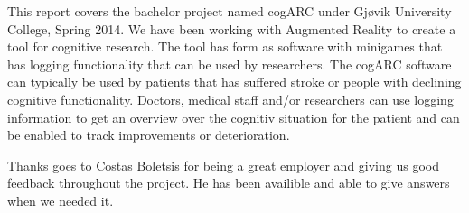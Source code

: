 This report covers the bachelor project named cogARC under Gj\o vik
University College, Spring 2014. We have been working with \gls{Augmented
Reality} to create a tool for cognitive research. The tool has form as software 
with minigames that has logging functionality that can be used by researchers. 
The cogARC software can typically be used by patients that has suffered stroke
or people with declining cognitive functionality. Doctors, medical staff and/or
researchers can use logging information to get an overview over the cognitiv
situation for the patient and can be enabled to track improvements or
deterioration.


Thanks goes to Costas Boletsis for being a great employer and giving us good feedback
throughout the project. He has been availible and able to give answers when we
needed it.

